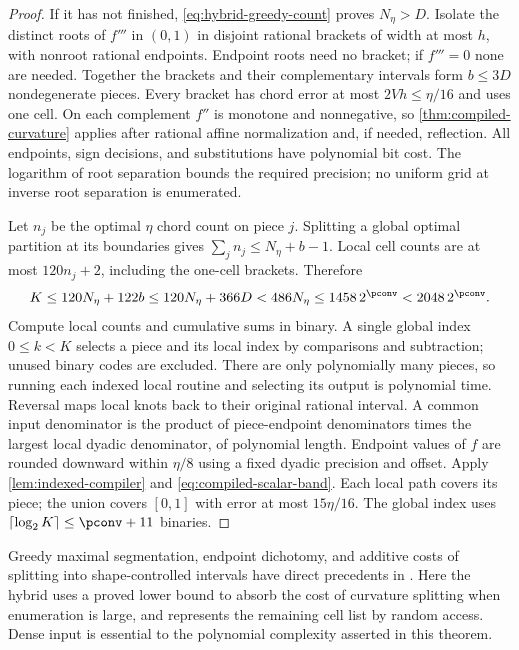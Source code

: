 \begin{proof}
If it has not finished, \eqref{eq:hybrid-greedy-count} proves
$N_\eta>D$. Isolate the distinct roots of $f'''$ in $(0,1)$ in
disjoint rational brackets of width at most $h$, with nonroot rational
endpoints. Endpoint roots need no bracket; if $f'''=0$ none are needed.
Together the brackets and their complementary intervals form
$b\le3D$ nondegenerate pieces. Every bracket has chord error at most
$2Vh\le\eta/16$ and uses one cell. On each complement $f''$ is
monotone and nonnegative, so \cref{thm:compiled-curvature} applies
after rational affine normalization and, if needed, reflection.
All endpoints, sign decisions, and substitutions have polynomial bit
cost. The logarithm of root separation bounds the required precision;
no uniform grid at inverse root separation is enumerated.

Let $n_j$ be the optimal $\eta$ chord count on piece $j$. Splitting
a global optimal partition at its boundaries gives
$\sum_jn_j\le N_\eta+b-1$. Local cell counts are at most
$120n_j+2$, including the one-cell brackets. Therefore
\begin{equation}\label{eq:hybrid-total-cells}
 K\le120N_\eta+122b\le120N_\eta+366D
 <486N_\eta\le1458\,2^{\pconv}<2048\,2^{\pconv}.
\end{equation}
Compute local counts and cumulative sums in binary. A single global
index $0\le k<K$ selects a piece and its local index by comparisons
and subtraction; unused binary codes are excluded. There are only
polynomially many pieces, so running each indexed local routine and
selecting its output is polynomial time. Reversal maps local knots
back to their original rational interval. A common input denominator
is the product of piece-endpoint denominators times the largest local
dyadic denominator, of polynomial length. Endpoint values of $f$ are
rounded downward within $\eta/8$ using a fixed dyadic precision and
offset. Apply \cref{lem:indexed-compiler} and
\eqref{eq:compiled-scalar-band}. Each local path covers its piece;
the union covers $[0,1]$ with error at most $15\eta/16$.
The global index uses $\lceil\log_2K\rceil\le\pconv+11$ binaries.
\end{proof}

Greedy maximal segmentation, endpoint dichotomy, and additive costs of
splitting into shape-controlled intervals have direct precedents in
\citet[Sections 3--5]{codsi2021}. Here the hybrid uses a proved lower
bound to absorb the cost of curvature splitting when enumeration is
large, and represents the remaining cell list by random access. Dense
input is essential to the polynomial complexity asserted in this theorem.

